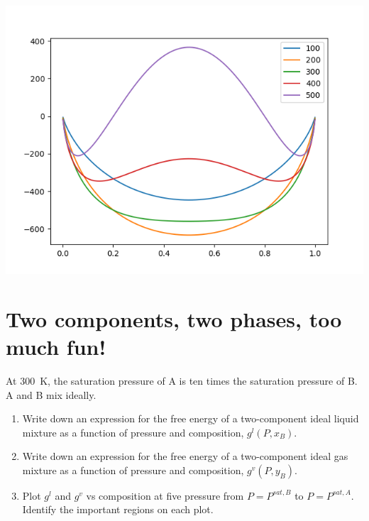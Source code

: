 \documentclass[11pt]{article}
\begin{document}
\begin{center}
\includegraphics[width=.9\linewidth]{./inverse.png}
\end{center}

\section{Two components, two phases, too much fun!}
\label{sec:org2577332}
At \SI{300}{K}, the saturation pressure of A is ten times the saturation pressure of B. A and B mix ideally.

\begin{enumerate}
\item Write down an expression for the free energy of a two-component ideal liquid mixture as
a function of pressure and composition, \(g^{l}(P,x_{B})\).
\item Write down an expression for the free energy of a two-component ideal gas mixture as a
function of pressure and composition, \(g^{v}(P,y_{B})\).
\item Plot \(g^{l}\) and \(g^{v}\) vs composition at five pressure from \(P = P^{sat,B}\) to
\(P = P^{sat,A}\).  Identify the important regions on each plot.
\end{enumerate}
\end{document}
